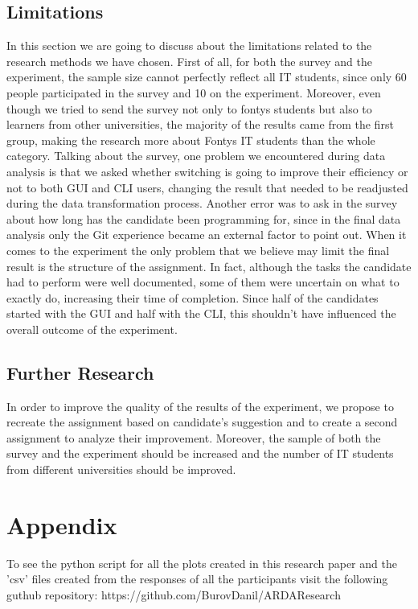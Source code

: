 \documentclass[]{report}
\begin{document}
	\subsection{Limitations}
	In this section we are going to discuss about the limitations related to the research methods we have chosen.
	First of all, for both the survey and the experiment, the sample size cannot perfectly reflect all IT students, since only 60 people participated in the survey and 10 on the experiment.
	Moreover, even though we tried to send the survey not only to fontys students but also to learners from other universities, the majority of the results came from the first group, making the research more about Fontys IT students than the whole category.
	Talking about the survey, one problem we encountered during data analysis is that we asked whether switching is going to improve their efficiency or not to both GUI and CLI users, changing the result that needed to be readjusted during the data transformation process. Another error was to ask in the survey about how long has the candidate been programming for, since in the final data analysis only the Git experience became an external factor to point out.
	When it comes to the experiment the only problem that we believe may limit the final result is the structure of the assignment. In fact, although the tasks the candidate had to perform were well documented, some of them were uncertain on what to exactly do, increasing their time of completion. Since half of the candidates started with the GUI and half with the CLI, this shouldn't have influenced the overall outcome of the experiment.
	\subsection{Further Research}
	In order to improve the quality of the results of the experiment, we propose to recreate the assignment based on candidate's suggestion and to create a second assignment to analyze their improvement. Moreover, the sample of both the survey and the experiment should be increased and the number of IT students from different universities should be improved. \newpage
	

	
	\section{Appendix}
	
	To see the python script for all the plots created in this research paper and the 'csv' files created from the responses of all the participants visit the following guthub repository: https://github.com/BurovDanil/ARDAResearch
	
\end{document}
